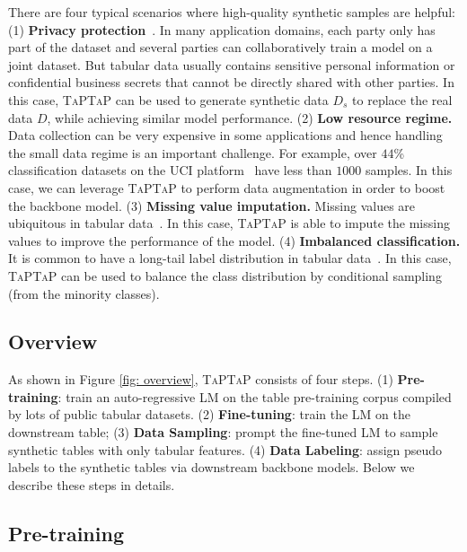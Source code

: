 There are four typical scenarios where high-quality synthetic samples are helpful: (1)
\textbf{Privacy protection}~\citep{DBLP:journals/popets/GasconSB0DZE17}. In many application domains, each party only has part of the dataset and several parties can collaboratively train a model on a joint dataset. But tabular data usually contains sensitive personal information or confidential business secrets that cannot be directly shared with other parties. In this case, \textsc{TaPTaP} can be used to generate synthetic data $D_s$ to replace the real data $D$, while achieving similar model performance. (2) \textbf{Low resource regime.} Data collection can be very expensive in some applications and hence handling the small data regime is an important challenge. For example, over $44$\% classification datasets on the UCI platform~\citep{UCI} have less than $1000$ samples. In this case, we can leverage \textsc{TaPTaP} to perform data augmentation in order to boost the backbone model. (3) \textbf{Missing value imputation.} Missing values are ubiquitous in tabular data~\citep{MissForest}. In this case, \textsc{TaPTaP} is able to impute the missing values to improve the performance of the model. (4) \textbf{Imbalanced classification.} It is common to have a long-tail label distribution in tabular data~\citep{DBLP:conf/nips/CaoWGAM19}. In this case, \textsc{TaPTaP} can be used to balance the class distribution by conditional sampling (from the minority classes).

\subsection{Overview}

As shown in Figure \ref{fig: overview}, \textsc{TaPTaP} consists of four steps. (1) \textbf{Pre-training}: train an auto-regressive LM on the table pre-training corpus compiled by lots of public tabular datasets. (2) \textbf{Fine-tuning}: train the LM on the downstream table; (3) \textbf{Data Sampling}: prompt the fine-tuned LM to sample synthetic tables with only tabular features. (4) \textbf{Data Labeling}: assign pseudo labels to the synthetic tables via downstream backbone models. Below we describe these steps in details.

\subsection{Pre-training}

